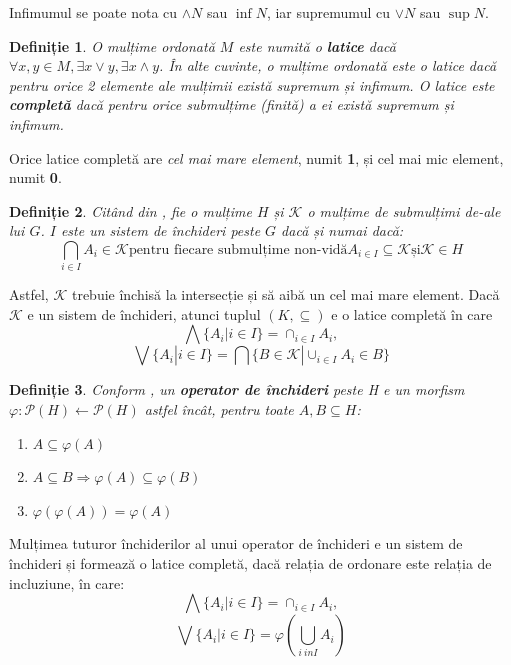 \documentclass[12pt, a4paper, twoside, romanian]{teza-upb}
\newtheorem{defn}{Definiție}
\begin{document}
    Infimumul se poate nota cu $\wedge N$ sau $\inf N$, iar supremumul cu $\vee N$ sau $\sup N$.

    \begin{defn}
      O mulțime ordonată $M$ este numită o \textbf{latice} dacă $\forall x,y \in M, \exists x \vee y, \exists x \wedge y$. În alte cuvinte, o mulțime ordonată este o latice dacă pentru orice 2 elemente ale mulțimii există supremum și infimum. O latice este \textbf{completă} dacă pentru orice submulțime (finită) a ei există supremum și infimum.
    \end{defn}

    Orice latice completă are \textit{cel mai mare element}, numit \textbf{1}, și cel mai mic element, numit \textbf{0}.


    \begin{defn}
      Citând din \cite{Carpineto:2004:CDA:975252}, fie o mulțime $H$ și $\mathcal{K}$ o mulțime de submulțimi de-ale lui $G$. $I$ este un sistem de închideri peste $G$ dacă și numai dacă:
      $$
        \bigcap_{i \in I} A_i \in \mathcal{K} \text{pentru fiecare submulțime non-vidă} A_{i \in I} \subseteq \mathcal{K} \text{și} \mathcal{K} \in H
      $$
    \end{defn}

    Astfel, $\mathcal{K}$ trebuie închisă la intersecție și să aibă un cel mai mare element. Dacă $\mathcal{K}$ e un sistem de închideri, atunci tuplul $(K, \subseteq)$ e o latice completă în care
      $$
      \bigwedge \{ A_i | i \in I \} = \cap_{i \in I} A_i, 
      $$
      $$
      \bigvee \{ A_i | i \in I \} = \bigcap \{ B \in \mathcal{K} | \cup _{i \in I} A_i \in B \}
    $$

    \begin{defn}
      Conform \cite{Carpineto:2004:CDA:975252}, un \textbf{operator de închideri} peste H e un morfism $\varphi : \mathcal{P}(H) \leftarrow \mathcal{P}(H)$ astfel încât, pentru toate $A, B \subseteq H$:
      \begin{enumerate}
        \item $A \subseteq \varphi(A)$
        \item $A \subseteq B \Rightarrow \varphi(A) \subseteq \varphi(B)$
        \item $\varphi(\varphi(A)) = \varphi(A)$
      \end{enumerate}
    \end{defn}

    \cite{Carpineto:2004:CDA:975252} Mulțimea tuturor închiderilor al unui operator de închideri e un sistem de închideri și formează o latice completă, dacă relația de ordonare este relația de incluziune, în care:
    $$
    \bigwedge\{A_i | i \in I \} = \cap_{i \in I} A_i,
    $$
    $$
    \bigvee \{A_i | i \in I \} = \varphi\left( \bigcup_{i \ in I} A_i \right)
    $$
\end{document}
